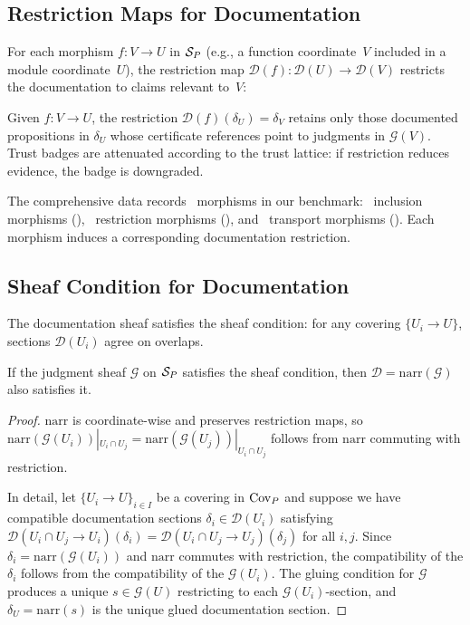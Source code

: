 \documentclass[11pt]{article}
\newcommand{\DocSheaf}{\mathcal{D}}
\newcommand{\DocSection}{\delta}
\newcommand{\NarrFunc}{\mathrm{narr}}
\begin{document}
\subsection{Restriction Maps for Documentation}
For each morphism $f \colon V \to U$ in $\mathcal{S}_P$ (e.g., a function
coordinate~$V$ included in a module coordinate~$U$), the restriction
map $\DocSheaf(f) \colon \DocSheaf(U) \to \DocSheaf(V)$ restricts
the documentation to claims relevant to~$V$:

\begin{definition}\label{def:doc-restrict}
Given $f \colon V \to U$, the restriction
$\DocSheaf(f)(\DocSection_U) = \DocSection_V$ retains only those
documented propositions in $\DocSection_U$ whose certificate
references point to judgments in $\mathcal{G}(V)$.  Trust badges
are attenuated according to the trust lattice: if restriction
reduces evidence, the badge is downgraded.
\end{definition}

The comprehensive data records \compMorphTotal\ morphisms in our
benchmark: \compMorphInclusion\ inclusion morphisms
(\compMorphInclusionPct), \compMorphRestriction\ restriction
morphisms (\compMorphRestrictionPct), and
\compMorphTransport\ transport morphisms
(\compMorphTransportPct).  Each morphism induces a corresponding
documentation restriction.

\subsection{Sheaf Condition for Documentation}
The documentation sheaf satisfies the sheaf condition: for any covering
$\{U_i \to U\}$, sections $\DocSheaf(U_i)$ agree on overlaps.

\begin{theorem}\label{thm:doc-coherence}
If the judgment sheaf $\mathcal{G}$ on $\mathcal{S}_P$ satisfies the sheaf
condition, then $\DocSheaf = \NarrFunc(\mathcal{G})$ also satisfies it.
\end{theorem}

\begin{proof}
$\NarrFunc$ is coordinate-wise and preserves restriction maps, so
$\NarrFunc(\mathcal{G}(U_i))|_{U_i \cap U_j} =
\NarrFunc(\mathcal{G}(U_j))|_{U_i \cap U_j}$ follows from $\NarrFunc$
commuting with restriction.

In detail, let $\{U_i \to U\}_{i \in I}$ be a covering in $\mathrm{Cov}_P$ and
suppose we have compatible documentation sections
$\DocSection_i \in \DocSheaf(U_i)$ satisfying
$\DocSheaf(U_i \cap U_j \to U_i)(\DocSection_i) =
\DocSheaf(U_i \cap U_j \to U_j)(\DocSection_j)$ for all $i, j$.
Since $\DocSection_i = \NarrFunc(\mathcal{G}(U_i))$ and $\NarrFunc$
commutes with restriction, the compatibility of the $\DocSection_i$
follows from the compatibility of the $\mathcal{G}(U_i)$.  The gluing
condition for $\mathcal{G}$ produces a unique $s \in \mathcal{G}(U)$
restricting to each $\mathcal{G}(U_i)$-section, and
$\DocSection_U = \NarrFunc(s)$ is the unique glued documentation
section.
\end{proof}
\end{document}
